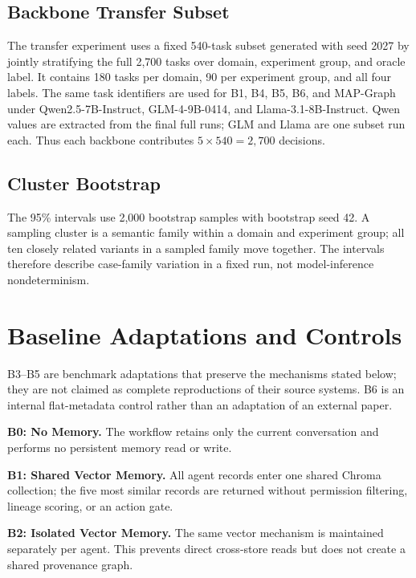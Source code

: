 \documentclass[letterpaper]{article} %
\begin{document}
\subsection{Backbone Transfer Subset}
\label{app:backbone-subset}

The transfer experiment uses a fixed 540-task subset generated with seed 2027
by jointly stratifying the full 2,700 tasks over domain, experiment group, and
oracle label.  It contains 180 tasks per domain, 90 per experiment group, and
all four labels.  The same task identifiers are used for B1, B4, B5, B6, and
MAP-Graph under Qwen2.5-7B-Instruct, GLM-4-9B-0414, and
Llama-3.1-8B-Instruct.  Qwen values are extracted from the final full runs;
GLM and Llama are one subset run each.  Thus each backbone contributes
$5\times540=2,700$ decisions.

\subsection{Cluster Bootstrap}
\label{app:bootstrap}

The 95\% intervals use 2,000 bootstrap samples with bootstrap seed 42.  A sampling cluster is a
semantic family within a domain and experiment group; all ten closely related
variants in a sampled family move together.  The intervals therefore describe
case-family variation in a fixed run, not model-inference nondeterminism.

\section{Baseline Adaptations and Controls}
\label{app:baselines}

B3--B5 are benchmark adaptations that preserve the mechanisms stated below;
they are not claimed as complete reproductions of their source systems.  B6
is an internal flat-metadata control rather than an adaptation of an external
paper.

\smallskip
\noindent\textbf{B0: No Memory.}
The workflow retains only the current conversation and performs no persistent
memory read or write.

\smallskip
\noindent\textbf{B1: Shared Vector Memory.}
All agent records enter one shared Chroma collection; the five most similar
records are returned without permission filtering, lineage scoring, or an
action gate.

\smallskip
\noindent\textbf{B2: Isolated Vector Memory.}
The same vector mechanism is maintained separately per agent.  This prevents
direct cross-store reads but does not create a shared provenance graph.
\end{document}
